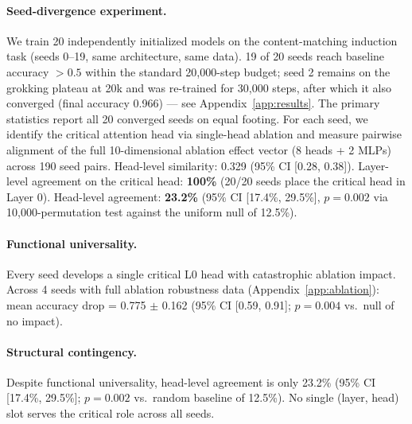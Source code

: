 \documentclass[final]{article}
\begin{document}
\paragraph{Seed-divergence experiment.}
We train 20 independently initialized models on the content-matching induction
task (seeds 0--19, same architecture, same data). 19 of 20 seeds reach baseline
accuracy $>0.5$ within the standard 20{,}000-step budget; seed 2 remains on the
grokking plateau at 20k and was re-trained for 30{,}000 steps, after which it
also converged (final accuracy 0.966) --- see Appendix~\ref{app:results}. The
primary statistics report all 20 converged seeds on equal footing. For each
seed, we identify the critical attention head via single-head ablation and
measure pairwise alignment of the full 10-dimensional ablation effect vector
(8 heads + 2 MLPs) across 190 seed pairs. Head-level similarity: 0.329
(95\% CI [0.28, 0.38]). Layer-level agreement on the critical head:
\textbf{100\%} (20/20 seeds place the critical head in Layer 0). Head-level
agreement: \textbf{23.2\%} (95\% CI [17.4\%, 29.5\%], $p=0.002$ via
10{,}000-permutation test against the uniform null of 12.5\%).

\paragraph{Functional universality.}
Every seed develops a single critical L0 head with catastrophic ablation impact.
Across 4 seeds with full ablation robustness data (Appendix~\ref{app:ablation}):
mean accuracy drop = 0.775 $\pm$ 0.162 (95\% CI [0.59, 0.91]; $p=0.004$ vs.\
null of no impact).

\paragraph{Structural contingency.}
Despite functional universality, head-level agreement is only 23.2\% (95\% CI
[17.4\%, 29.5\%]; $p=0.002$ vs.\ random baseline of 12.5\%). No single
(layer, head) slot serves the critical role across all seeds.
\end{document}
